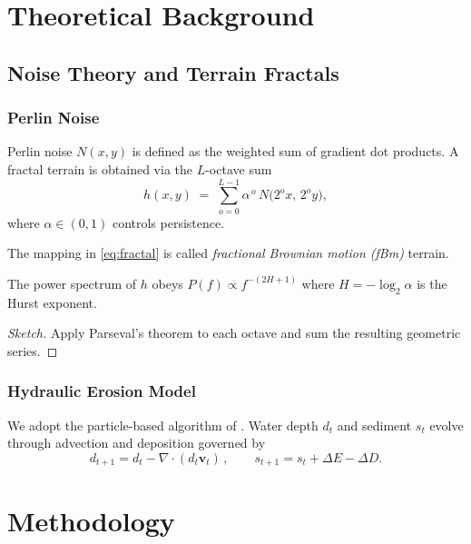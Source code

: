 \documentclass{report}
\begin{document}
\chapter{Theoretical Background}
\section{Noise Theory and Terrain Fractals}

\subsection{Perlin Noise}
Perlin noise \(N(x,y)\) is defined as the weighted sum of gradient dot
products.  A fractal terrain is obtained via the $L$-octave sum
\begin{equation}
  h(x,y) \;=\; \sum_{o=0}^{L-1} \alpha^{\,o} \,
  N\!\bigl(2^{o}x,\,2^{o}y\bigr),
  \label{eq:fractal}
\end{equation}
where \(\alpha\in(0,1)\) controls persistence.

\begin{definition}\label{def:fbm}
The mapping in \cref{eq:fractal} is called \emph{fractional Brownian motion
(fBm)} terrain.
\end{definition}

\begin{theorem}\label{thm:slope}
The power spectrum of \(h\) obeys \(P(f)\propto f^{-(2H+1)}\) where
\(H=-\log_2\alpha\) is the Hurst exponent.
\end{theorem}

\begin{proof}[Sketch]
Apply Parseval’s theorem to each octave and sum the resulting geometric series.
\end{proof}

\subsection{Hydraulic Erosion Model}
We adopt the particle-based algorithm of \cite{green2005implementing}.  Water depth
\(d_t\) and sediment \(s_t\) evolve through advection and deposition governed
by
\[
  d_{t+1} = d_t - \nabla\!\cdot(d_t\mathbf{v}_t)\,,\qquad
  s_{t+1} = s_t + \Delta E - \Delta D.
\]

\chapter{Methodology}
\end{document}
